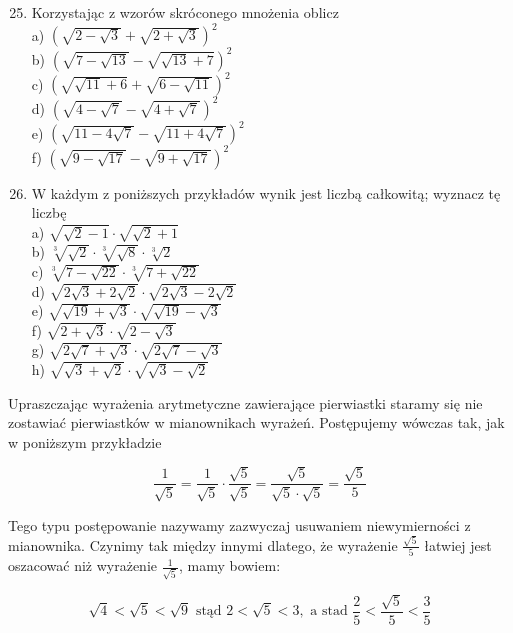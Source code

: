 \documentclass[10pt]{article}
\begin{document}
\begin{enumerate}
  \setcounter{enumi}{24}
  \item Korzystając z wzorów skróconego mnożenia oblicz\\
a) \((\sqrt{2-\sqrt{3}}+\sqrt{2+\sqrt{3}})^{2}\)\\
b) \((\sqrt{7-\sqrt{13}}-\sqrt{\sqrt{13}+7})^{2}\)\\
c) \((\sqrt{\sqrt{11}+6}+\sqrt{6-\sqrt{11}})^{2}\)\\
d) \((\sqrt{4-\sqrt{7}}-\sqrt{4+\sqrt{7}})^{2}\)\\
e) \((\sqrt{11-4 \sqrt{7}}-\sqrt{11+4 \sqrt{7}})^{2}\)\\
f) \((\sqrt{9-\sqrt{17}}-\sqrt{9+\sqrt{17}})^{2}\)
  \item W każdym z poniższych przykładów wynik jest liczbą całkowitą; wyznacz tę liczbę\\
a) \(\sqrt{\sqrt{2}-1} \cdot \sqrt{\sqrt{2}+1}\)\\
b) \(\sqrt[3]{\sqrt{2}} \cdot \sqrt[3]{\sqrt{8}} \cdot \sqrt[3]{2}\)\\
c) \(\sqrt[3]{7-\sqrt{22}} \cdot \sqrt[3]{7+\sqrt{22}}\)\\
d) \(\sqrt{2 \sqrt{3}+2 \sqrt{2}} \cdot \sqrt{2 \sqrt{3}-2 \sqrt{2}}\)\\
e) \(\sqrt{\sqrt{19}+\sqrt{3}} \cdot \sqrt{\sqrt{19}-\sqrt{3}}\)\\
f) \(\sqrt{2+\sqrt{3}} \cdot \sqrt{2-\sqrt{3}}\)\\
g) \(\sqrt{2 \sqrt{7}+\sqrt{3}} \cdot \sqrt{2 \sqrt{7}-\sqrt{3}}\)\\
h) \(\sqrt{\sqrt{3}+\sqrt{2}} \cdot \sqrt{\sqrt{3}-\sqrt{2}}\)
\end{enumerate}

Upraszczając wyrażenia arytmetyczne zawierające pierwiastki staramy się nie zostawiać pierwiastków w mianownikach wyrażeń. Postępujemy wówczas tak, jak w poniższym przykładzie

\[
\frac{1}{\sqrt{5}}=\frac{1}{\sqrt{5}} \cdot \frac{\sqrt{5}}{\sqrt{5}}=\frac{\sqrt{5}}{\sqrt{5} \cdot \sqrt{5}}=\frac{\sqrt{5}}{5}
\]

Tego typu postępowanie nazywamy zazwyczaj usuwaniem niewymierności z mianownika. Czynimy tak między innymi dlatego, że wyrażenie \(\frac{\sqrt{5}}{5}\) łatwiej jest oszacować niż wyrażenie \(\frac{1}{\sqrt{5}}\), mamy bowiem:

\[
\sqrt{4}<\sqrt{5}<\sqrt{9} \text { stąd } 2<\sqrt{5}<3, \text { a stad } \frac{2}{5}<\frac{\sqrt{5}}{5}<\frac{3}{5}
\]
\end{document}

